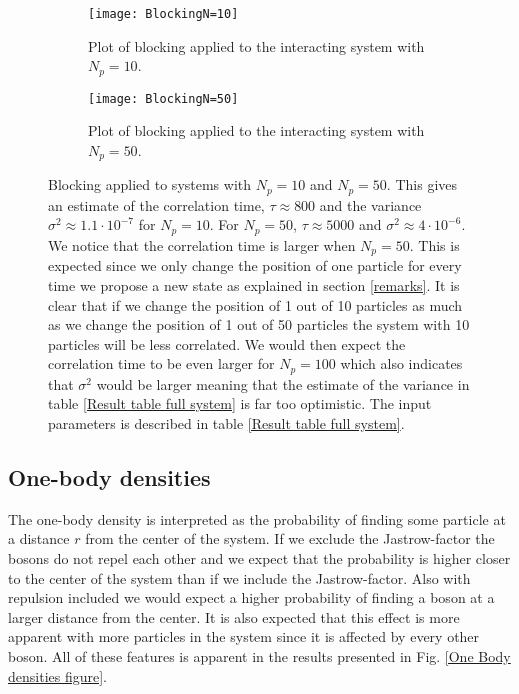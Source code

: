\documentclass[a4paper,10pt]{article}
\begin{document}
\begin{figure}[h!] 
    \centering
    \begin{subfigure}[b]{0.48\textwidth}
        \texttt{[image: BlockingN=10]}
        \caption{Plot of blocking applied to the interacting system with $N_p = 10$.}
        \label{N=10}
    \end{subfigure}
    \begin{subfigure}[b]{0.48\textwidth}
        \texttt{[image: BlockingN=50]}
        \caption{Plot of blocking applied to the interacting system with $N_p = 50$.}
        \label{N=50}
    \end{subfigure}
    \caption{Blocking applied to systems with $N_p = 10$ and $N_p = 50$. This gives an estimate of the correlation time, $\tau \approx 800$
     and the variance $\sigma^2 \approx 1.1 \cdot 10^{-7}$ for $N_p = 10$. For $N_p = 50$, $\tau \approx 5000$ and $\sigma^2 \approx 4 \cdot 10^{-6}$. We notice that the correlation time is larger when $N_p = 50$. 
     This is expected since we only change the position of one particle for every time we propose a new state as explained in section \ref{remarks}.
     It is clear that if we change the position of 1 out of 10 particles as much as we change the position of 1 out of 50 particles the
     system with 10 particles will be less correlated. We would then expect the correlation time to be even larger for
     $N_p = 100$ which also indicates that $\sigma^2$ would be larger meaning that the estimate of the variance in table \ref{Result table full system}
     is far too optimistic. The input parameters is described in table \ref{Result table full system}.}
    \label{Blocking plot}
\end{figure} 

\subsection{One-body densities}
The one-body density is interpreted as the probability of finding some particle at a distance $r$ from the center of the system.
If we exclude the Jastrow-factor the bosons do not repel each other and we expect that the probability is higher closer to the center of the system
than if we include the Jastrow-factor. Also with repulsion included we would expect a higher probability of finding a boson at a larger distance from the center.
It is also expected that this effect is more apparent with more particles in the system since it is affected by every other boson. All of these features is apparent in the results presented in 
Fig. \ref{One Body densities figure}.
\end{document}
